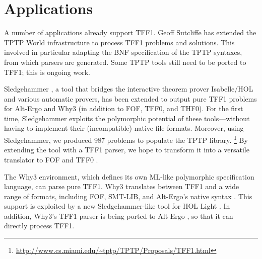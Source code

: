 \section{Applications}
\label{sec_apps}

A number of applications already support TFF1. Geoff
Sutcliffe has extended the TPTP World infrastructure to process TFF1 problems
and solutions. This involved in particular adapting the BNF specification of the
TPTP syntaxes, from which parsers are generated. Some TPTP tools still need to be
ported to TFF1; this is ongoing work.


Sledgehammer \cite{paulson-blanchette-2010}, a tool that bridges the interactive
theorem prover Isabelle\slash HOL and various automatic provers, has been
extended to output pure TFF1 problems for Alt-Ergo and Why3
(in addition to FOF, TFF0, and THF0). For the first time, Sledgehammer
exploits the polymorphic potential of these tools---without having
to implement their (incompatible) native file formats.
Moreover, using Sledgehammer, we produced 987 problems to populate the TPTP
library.%
\footnote{\url{http://www.cs.miami.edu/~tptp/TPTP/Proposals/TFF1.html}}
By extending the tool with a TFF1 parser,
we hope to transform it into a versatile translator to FOF and
TFF0 \cite{blanchette-et-al-2013-types}.

The Why3 \cite{bobot-et-al-2011} environment, which defines its own ML-like
polymorphic specification language, can parse pure TFF1. Why3 translates
between TFF1 and a wide range of
formats, including FOF, SMT-LIB, and
Alt-Ergo's native syntax \cite{couchot-lescuyer-2007,bobot-paskevich-2011}.
This support is exploited by a new Sledgehammer-like tool for HOL Light
\cite{kaliszyk-urban-2013}.
In addition, Why3's TFF1 parser is being ported to
Alt-Ergo \cite{bobot-et-al-2008}, so that it can directly process TFF1. %



